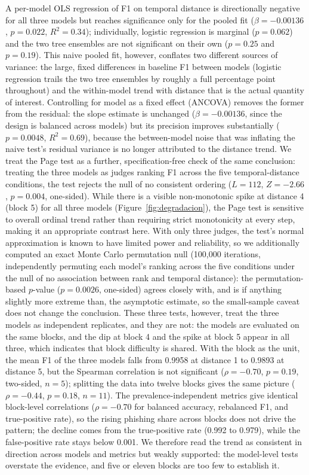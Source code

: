 \documentclass[10pt, a4paper, oneside]{article}
\begin{document}
A per-model OLS regression of F1 on temporal distance is directionally negative for all three models but reaches significance only for the pooled fit ($\beta = -0.00136$, $p = 0.022$, $R^2=0.34$); individually, logistic regression is marginal ($p=0.062$) and the two tree ensembles are not significant on their own ($p=0.25$ and $p=0.19$). This naive pooled fit, however, conflates two different sources of variance: the large, fixed differences in baseline F1 between models (logistic regression trails the two tree ensembles by roughly a full percentage point throughout) and the within-model trend with distance that is the actual quantity of interest. Controlling for model as a fixed effect (ANCOVA) removes the former from the residual: the slope estimate is unchanged ($\beta=-0.00136$, since the design is balanced across models) but its precision improves substantially ($p=0.0048$, $R^2=0.69$), because the between-model noise that was inflating the naive test's residual variance is no longer attributed to the distance trend. We treat the Page test as a further, specification-free check of the same conclusion: treating the three models as judges ranking F1 across the five temporal-distance conditions, the test rejects the null of no consistent ordering ($L=112$, $Z=-2.66$, $p=0.004$, one-sided). While there is a visible non-monotonic spike at distance 4 (block 5) for all three models (Figure~\ref{fig:degradacion}), the Page test is sensitive to overall ordinal trend rather than requiring strict monotonicity at every step, making it an appropriate contrast here. With only three judges, the test's normal approximation is known to have limited power and reliability, so we additionally computed an exact Monte Carlo permutation null (100,000 iterations, independently permuting each model's ranking across the five conditions under the null of no association between rank and temporal distance): the permutation-based $p$-value ($p=0.0026$, one-sided) agrees closely with, and is if anything slightly more extreme than, the asymptotic estimate, so the small-sample caveat does not change the conclusion. These three tests, however, treat the three models as independent replicates, and they are not: the models are evaluated on the same blocks, and the dip at block 4 and the spike at block 5 appear in all three, which indicates that block difficulty is shared. With the block as the unit, the mean F1 of the three models falls from 0.9958 at distance 1 to 0.9893 at distance 5, but the Spearman correlation is not significant ($\rho=-0.70$, $p=0.19$, two-sided, $n=5$); splitting the data into twelve blocks gives the same picture ($\rho=-0.44$, $p=0.18$, $n=11$). The prevalence-independent metrics give identical block-level correlations ($\rho=-0.70$ for balanced accuracy, rebalanced F1, and true-positive rate), so the rising phishing share across blocks does not drive the pattern; the decline comes from the true-positive rate (0.992 to 0.979), while the false-positive rate stays below 0.001. We therefore read the trend as consistent in direction across models and metrics but weakly supported: the model-level tests overstate the evidence, and five or eleven blocks are too few to establish it.
\end{document}
